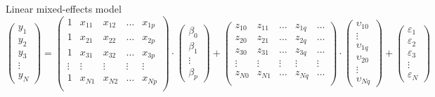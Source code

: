 \documentclass[aspectratio=169]{beamer}
\begin{document}
\begin{frame}[shrink=10]{Linear mixed-effects model}
\vspace{2cm}
\begin{equation*}
  \begin{pmatrix}
    y_1 \\
    y_2 \\
    y_3 \\
    \vdots \\
    y_N
  \end{pmatrix} = 
  \begin{pmatrix}
    1 & x_{11} & x_{12} & \dots & x_{1p} \\
    1 & x_{21} & x_{22} & \dots & x_{2p} \\
    1 & x_{31} & x_{32} & \dots & x_{3p} \\
    \vdots & \vdots & \vdots & \vdots & \vdots \\
    1 & x_{N1} & x_{N2} & \dots & x_{Np} \\
  \end{pmatrix} \cdot
  \begin{pmatrix}
    \beta_0 \\
    \beta_1 \\
    \vdots \\
    \beta_p
  \end{pmatrix} +
  \begin{pmatrix}
    z_{10} & z_{11} & \dots & z_{1q} & \dots \\
    z_{20} & z_{21} & \dots & z_{2q} & \dots \\
    z_{30} & z_{31} & \dots & z_{3q} & \dots \\
    \vdots & \vdots & \vdots & \vdots & \vdots \\
    z_{N0} & z_{N1} & \dots & z_{Nq} & \dots \\
  \end{pmatrix} \cdot
  \begin{pmatrix}
    \upsilon_{10} \\
    \vdots \\
    \upsilon_{1q}\\
    \upsilon_{20} \\
    \vdots \\
    \upsilon_{Nq}
  \end{pmatrix} + 
  \begin{pmatrix}
    \varepsilon_1 \\
    \varepsilon_2 \\
    \varepsilon_3 \\
    \vdots \\
    \varepsilon_N
  \end{pmatrix}
\end{equation*}
\end{frame}
\end{document}
